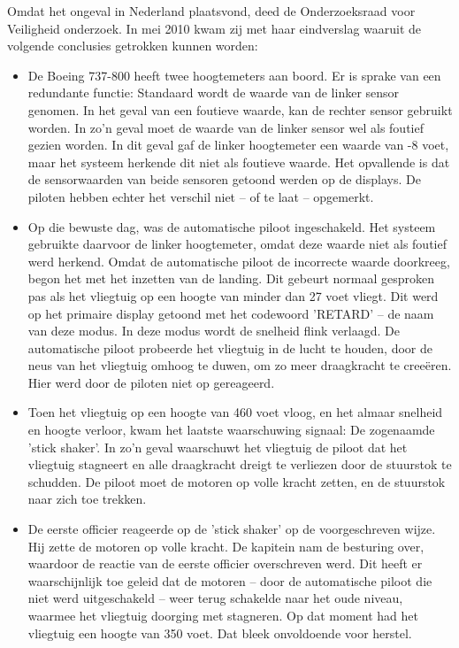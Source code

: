 \documentclass{article}
\begin{document}
					Omdat het ongeval in Nederland plaatsvond, deed de Onderzoeksraad voor Veiligheid onderzoek. In mei 2010 kwam zij met haar eindverslag waaruit de volgende conclusies getrokken kunnen worden: \cite{OvV2009} \par
				
				\begin{itemize}

					\item De Boeing 737-800 heeft twee hoogtemeters aan boord. Er is sprake van een redundante functie: Standaard wordt de waarde van de linker sensor genomen. In het geval van een foutieve waarde, kan de rechter sensor gebruikt worden. In zo'n geval moet de waarde van de linker sensor wel als foutief gezien worden. In dit geval gaf de linker hoogtemeter een waarde van -8 voet, maar het systeem herkende dit niet als foutieve waarde. Het opvallende is dat de sensorwaarden van beide sensoren getoond werden op de displays. De piloten hebben echter het verschil niet -- of te laat -- opgemerkt.

					\item Op die bewuste dag, was de automatische piloot ingeschakeld. Het systeem gebruikte daarvoor de linker hoogtemeter, omdat deze waarde niet als foutief werd herkend. Omdat de automatische piloot de incorrecte waarde doorkreeg, begon het met het inzetten van de landing. Dit gebeurt normaal gesproken pas als het vliegtuig op een hoogte van minder dan 27 voet vliegt. Dit werd op het primaire display getoond met het codewoord 'RETARD' -- de naam van deze modus. In deze modus wordt de snelheid flink verlaagd. De automatische piloot probeerde het vliegtuig in de lucht te houden, door de neus van het vliegtuig omhoog te duwen, om zo meer draagkracht te creeëren. Hier werd door de piloten niet op gereageerd.

					\item Toen het vliegtuig op een hoogte van 460 voet vloog, en het almaar snelheid en hoogte verloor, kwam het laatste waarschuwing signaal: De zogenaamde 'stick shaker'. In zo'n geval waarschuwt het vliegtuig de piloot dat het vliegtuig stagneert en alle draagkracht dreigt te verliezen door de stuurstok te schudden. De piloot moet de motoren op volle kracht zetten, en de stuurstok naar zich toe trekken.

					\item De eerste officier reageerde op de 'stick shaker' op de voorgeschreven wijze. Hij zette de motoren op volle kracht. De kapitein nam de besturing over, waardoor de reactie van de eerste officier overschreven werd. Dit heeft er waarschijnlijk toe geleid dat de motoren -- door de automatische piloot die niet werd uitgeschakeld -- weer terug schakelde naar het oude niveau, waarmee het vliegtuig doorging met stagneren. Op dat moment had het vliegtuig een hoogte van 350 voet. Dat bleek onvoldoende voor herstel.


\end{itemize}
\end{document}
